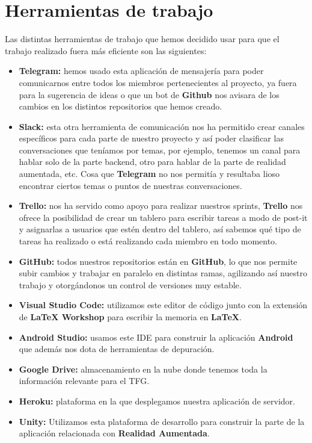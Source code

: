 \section{Herramientas de trabajo}
\label{makereference4.5}
Las distintas herramientas de trabajo que hemos decidido usar para que el trabajo realizado fuera más eficiente son las siguientes:
\begin{itemize}
    \item \textbf{Telegram:} hemos usado esta aplicación de mensajería para poder comunicarnos entre todos los miembros pertenecientes al proyecto, ya fuera para la sugerencia de ideas o que un bot de \textbf{Github} nos avisara de los cambios en los distintos repositorios que hemos creado. 
    \item \textbf{Slack:} esta otra herramienta de comunicación nos ha permitido crear canales específicos para cada parte de nuestro proyecto y así poder clasificar las conversaciones que teníamos por temas, por ejemplo, tenemos un canal para hablar solo de la parte backend, otro para hablar de la parte de realidad aumentada, etc. Cosa que \textbf{Telegram} no nos permitía y resultaba lioso encontrar ciertos temas o puntos de nuestras conversaciones. 
    \item \textbf{Trello:} nos ha servido como apoyo para realizar nuestros sprints, \textbf{Trello} nos ofrece la posibilidad de crear un tablero para escribir tareas a modo de post-it y asignarlas a usuarios que estén dentro del tablero, así sabemos qué tipo de tareas ha realizado o está realizando cada miembro en todo momento.
    \item \textbf{GitHub:} todos nuestros repositorios están en \textbf{GitHub}, lo que nos permite subir cambios y trabajar en paralelo en distintas ramas, agilizando así nuestro trabajo y otorgándonos un control de versiones muy estable.
    \item \textbf{Visual Studio Code:} utilizamos este editor de código junto con la extensión de \textbf{LaTeX Workshop} para escribir la memoria en \textbf{LaTeX}.
    \item \textbf{Android Studio:} usamos este IDE para construir la aplicación \textbf{Android} que además nos dota de herramientas de depuración.
    \item \textbf{Google Drive:} almacenamiento en la nube donde tenemos toda la información relevante para el TFG.
    \item \textbf{Heroku:} plataforma en la que desplegamos nuestra aplicación de servidor.
    \item \textbf{Unity:} Utilizamos esta plataforma de desarrollo para construir la parte de la aplicación relacionada con \textbf{Realidad Aumentada}.

\end{itemize}
